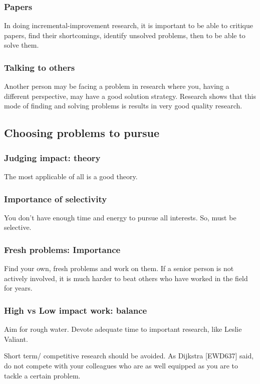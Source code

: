 \documentclass[oneside, article]{memoir}
\begin{document}
\subsubsection{Papers}
In doing incremental-improvement research, it is important to be able to critique papers, find their shortcomings, identify unsolved problems, then to be able to solve them.

\subsubsection{Talking to others}
Another person may be facing a problem in research where you, having a different perspective, may have a good solution strategy. Research shows that this mode of finding and solving problems is results in very good quality research.

\subsection{Choosing problems to pursue}
\subsubsection{Judging impact: theory}
The most applicable of all is a good theory.

\subsubsection{Importance of selectivity}
You don't have enough time and energy to pursue all interests. So, must be selective.

\subsubsection{Fresh problems: Importance}
Find your own, fresh problems and work on them. If a senior person is not actively involved, it is much harder to beat others who have worked in the field for years.

\subsubsection{High vs Low impact work: balance}
Aim for rough water. Devote adequate time to important research, like Leslie Valiant.

Short term/ competitive research should be avoided. As Dijkstra [EWD637] said, do not compete with your colleagues who are as well equipped as you are to tackle a certain problem.
\end{document}
